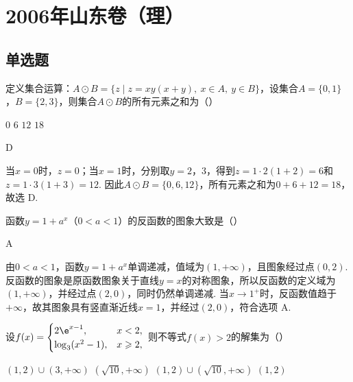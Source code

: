 \chapter{2006年山东卷（理）}

\section{单选题}

\begin{problem}
定义集合运算：\(A\odot B=\{z\mid z=xy(x+y),\ x\in A,\ y\in B\}\)，设集合\(A=\{0,1\}\)，\(B=\{2,3\}\)，则集合\(A\odot B\)的所有元素之和为（\quad）

\choices
    {\(0\)}
    {\(6\)}
    {\(12\)}
    {\(18\)}
\end{problem}

\begin{answer}
D
\end{answer}

\begin{solution}
当\(x=0\)时，\(z=0\)；当\(x=1\)时，分别取\(y=2\)，\(3\)，得到\(z=1\cdot2(1+2)=6\)和\(z=1\cdot3(1+3)=12\). 因此\(A\odot B=\{0,6,12\}\)，所有元素之和为\(0+6+12=18\)，故选 D.
\end{solution}

\begin{problem}
函数\(y=1+a^x\)（\(0<a<1\)）的反函数的图象大致是（\quad）

    {}
    {}
    {}
\end{problem}

\begin{answer}
A
\end{answer}

\begin{solution}
由\(0<a<1\)，函数\(y=1+a^x\)单调递减，值域为\((1,+\infty)\)，且图象经过点\((0,2)\). 反函数的图象是原函数图象关于直线\(y=x\)的对称图象，所以反函数的定义域为\((1,+\infty)\)，并经过点\((2,0)\)，同时仍然单调递减. 当\(x\to1^+\)时，反函数值趋于\(+\infty\)，故其图象具有竖直渐近线\(x=1\)，并经过\((2,0)\)，符合选项 A.
\end{solution}

\begin{problem}
设\(f(x)=\begin{cases}
2\e^{x-1},&x<2,\\
\log_3(x^2-1),&x\geqslant2,
\end{cases}\) 则不等式\(f(x)>2\)的解集为（\quad）

\choices
    {\((1,2)\cup(3,+\infty)\)}
    {\((\sqrt{10},+\infty)\)}
    {\((1,2)\cup(\sqrt{10},+\infty)\)}
    {\((1,2)\)}
\end{problem}

